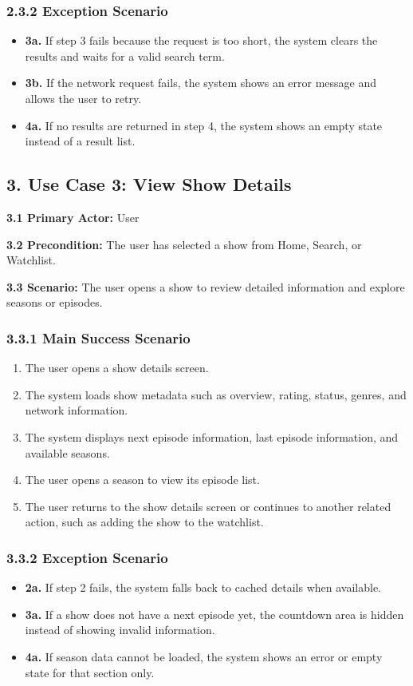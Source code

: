 \subsubsection*{2.3.2 Exception Scenario}
\begin{itemize}
	\item \textbf{3a.} If step 3 fails because the request is too short, the system clears the results and waits for a valid search term.
	\item \textbf{3b.} If the network request fails, the system shows an error message and allows the user to retry.
	\item \textbf{4a.} If no results are returned in step 4, the system shows an empty state instead of a result list.
\end{itemize}

\subsection*{3. Use Case 3: View Show Details}
\noindent\textbf{3.1 Primary Actor:} User

\noindent\textbf{3.2 Precondition:} The user has selected a show from Home, Search, or Watchlist.

\noindent\textbf{3.3 Scenario:} The user opens a show to review detailed information and explore seasons or episodes.

\subsubsection*{3.3.1 Main Success Scenario}
\begin{enumerate}[label=\arabic*.]
	\item The user opens a show details screen.
	\item The system loads show metadata such as overview, rating, status, genres, and network information.
	\item The system displays next episode information, last episode information, and available seasons.
	\item The user opens a season to view its episode list.
	\item The user returns to the show details screen or continues to another related action, such as adding the show to the watchlist.
\end{enumerate}

\subsubsection*{3.3.2 Exception Scenario}
\begin{itemize}
	\item \textbf{2a.} If step 2 fails, the system falls back to cached details when available.
	\item \textbf{3a.} If a show does not have a next episode yet, the countdown area is hidden instead of showing invalid information.
	\item \textbf{4a.} If season data cannot be loaded, the system shows an error or empty state for that section only.
\end{itemize}

